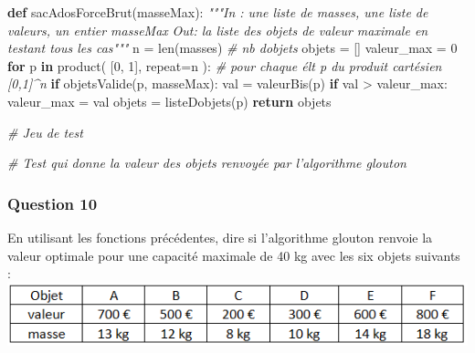 \documentclass[
  paper=a4,
  ,captions=tableheading
]{scrartcl}
\newenvironment{Shaded}{}{}
\newcommand{\BuiltInTok}[1]{\textcolor[rgb]{0.00,0.50,0.00}{#1}}
\newcommand{\CommentTok}[1]{\textcolor[rgb]{0.38,0.63,0.69}{\textit{#1}}}
\newcommand{\ControlFlowTok}[1]{\textcolor[rgb]{0.00,0.44,0.13}{\textbf{#1}}}
\newcommand{\DecValTok}[1]{\textcolor[rgb]{0.25,0.63,0.44}{#1}}
\newcommand{\KeywordTok}[1]{\textcolor[rgb]{0.00,0.44,0.13}{\textbf{#1}}}
\newcommand{\NormalTok}[1]{#1}
\newcommand{\OperatorTok}[1]{\textcolor[rgb]{0.40,0.40,0.40}{#1}}
\begin{document}
\begin{Shaded}
\begin{Highlighting}[]
\KeywordTok{def}\NormalTok{ sacAdosForceBrut(masseMax):}
    \CommentTok{"""In : une liste de masses, une liste de valeurs, un entier masseMax}
\CommentTok{    Out: la liste des objets de valeur maximale en testant tous les cas"""}
\NormalTok{    n }\OperatorTok{=} \BuiltInTok{len}\NormalTok{(masses)  }\CommentTok{\# nb d\textquotesingle{}objets}
\NormalTok{    objets }\OperatorTok{=}\NormalTok{ []}
\NormalTok{    valeur\_max }\OperatorTok{=} \DecValTok{0}
    \ControlFlowTok{for}\NormalTok{ p }\KeywordTok{in}\NormalTok{ product(}
\NormalTok{        [}\DecValTok{0}\NormalTok{, }\DecValTok{1}\NormalTok{], repeat}\OperatorTok{=}\NormalTok{n}
\NormalTok{    ):  }\CommentTok{\# pour chaque élt p du produit cartésien [0,1]\^{}n}
        \ControlFlowTok{if}\NormalTok{ objetsValide(p, masseMax):}
\NormalTok{            val }\OperatorTok{=}\NormalTok{ valeurBis(p)}
            \ControlFlowTok{if}\NormalTok{ val }\OperatorTok{\textgreater{}}\NormalTok{ valeur\_max:}
\NormalTok{                valeur\_max }\OperatorTok{=}\NormalTok{ val}
\NormalTok{                objets }\OperatorTok{=}\NormalTok{ listeDobjets(p)}
    \ControlFlowTok{return}\NormalTok{ objets}
\end{Highlighting}
\end{Shaded}

\begin{Shaded}
\begin{Highlighting}[]
\CommentTok{\# Jeu de test}
\end{Highlighting}
\end{Shaded}

\begin{Shaded}
\begin{Highlighting}[]
\CommentTok{\# Test qui donne la valeur des objets renvoyée par l’algorithme glouton}
\end{Highlighting}
\end{Shaded}

\hypertarget{question-10}{%
\subsubsection{Question 10}\label{question-10}}

En utilisant les fonctions précédentes, dire si l'algorithme glouton
renvoie la valeur optimale pour une capacité maximale de 40 kg avec les
six objets suivants : \includegraphics{images/4-image.png}
\end{document}
